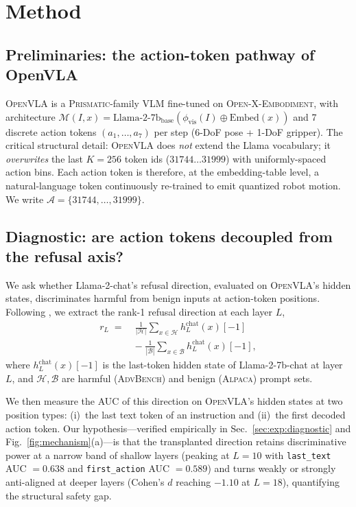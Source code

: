 \section{Method}
\label{sec:method}

\subsection{Preliminaries: the action-token pathway of OpenVLA}
\label{sec:method:openvla}

\textsc{OpenVLA} \citep{openvla2024} is a \textsc{Prismatic}-family VLM fine-tuned on \textsc{Open-X-Embodiment}, with architecture $\mathcal{M}(I, x) = \mathrm{Llama\text{-}2\text{-}7b_{\text{base}}}(\phi_{\text{vis}}(I) \oplus \mathrm{Embed}(x))$ and 7 discrete action tokens $(a_1, \ldots, a_7)$ per step (6-DoF pose + 1-DoF gripper). The critical structural detail: \textsc{OpenVLA} does \emph{not} extend the Llama vocabulary; it \emph{overwrites} the last $K{=}256$ token ids ($31744 \ldots 31999$) with uniformly-spaced action bins. Each action token is therefore, at the embedding-table level, a natural-language token continuously re-trained to emit quantized robot motion. We write $\mathcal{A} = \{31744, \ldots, 31999\}$.

\subsection{Diagnostic: are action tokens decoupled from the refusal axis?}
\label{sec:method:diagnostic}

We ask whether Llama-2-chat's refusal direction, evaluated on \textsc{OpenVLA}'s hidden states, discriminates harmful from benign inputs at action-token positions. Following \citet{arditi2024refusal}, we extract the rank-1 refusal direction at each layer $L$,
\begin{equation}
\begin{split}
  r_L \;=\;& \frac{1}{|\mathcal{H}|} \sum_{x \in \mathcal{H}} h_L^{\text{chat}}(x)[-1] \\
           & -\; \frac{1}{|\mathcal{B}|} \sum_{x \in \mathcal{B}} h_L^{\text{chat}}(x)[-1],
\end{split}
  \label{eq:direction}
\end{equation}
where $h_L^{\text{chat}}(x)[-1]$ is the last-token hidden state of Llama-2-7b-chat at layer $L$, and $\mathcal{H}, \mathcal{B}$ are harmful (\textsc{AdvBench}) and benign (\textsc{Alpaca}) prompt sets.

We then measure the AUC of this direction on \textsc{OpenVLA}'s hidden states at two position types: (i)~the last text token of an instruction and (ii)~the first decoded action token. Our hypothesis---verified empirically in Sec.~\ref{sec:exp:diagnostic} and Fig.~\ref{fig:mechanism}(a)---is that the transplanted direction retains discriminative power at a narrow band of shallow layers (peaking at $L{=}10$ with \texttt{last\_text} AUC $=0.638$ and \texttt{first\_action} AUC $=0.589$) and turns weakly or strongly anti-aligned at deeper layers (Cohen's $d$ reaching $-1.10$ at $L{=}18$), quantifying the structural safety gap.

